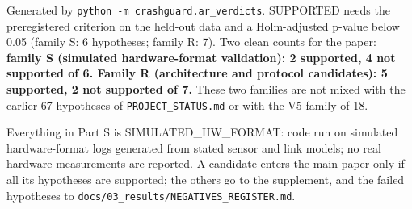 


Generated by \texttt{python -m crashguard.ar\_verdicts}. SUPPORTED needs the preregistered criterion on the held-out data and a Holm-adjusted p-value below 0.05 (family S: 6 hypotheses; family R: 7). Two clean counts for the paper: \textbf{family S (simulated hardware-format validation): 2 supported, 4 not supported of 6. Family R (architecture and protocol candidates): 5 supported, 2 not supported of 7.} These two families are not mixed with the earlier 67 hypotheses of \texttt{PROJECT\_STATUS.md} or with the V5 family of 18.

Everything in Part S is SIMULATED\_HW\_FORMAT: code run on simulated hardware-format logs generated from stated sensor and link models; no real hardware measurements are reported. A candidate enters the main paper only if all its hypotheses are supported; the others go to the supplement, and the failed hypotheses to \texttt{docs/03\_results/NEGATIVES\_REGISTER.md}.


